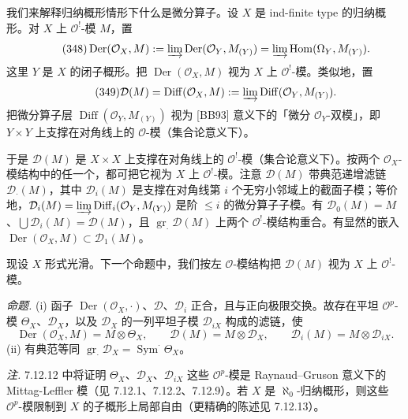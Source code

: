  我们来解释归纳概形情形下什么是微分算子。设 $X$ 是 ind-finite type 的归纳概形。对 $X$ 上 $\mathcal{O}^!$-模 $M$，置
\begin{equation}\tag{348}
\operatorname{Der}(\mathcal{O}_X,M):=\varinjlim\operatorname{Der}(\mathcal{O}_Y,M_{(Y)})=\varinjlim\operatorname{Hom}(\Omega_Y,M_{(Y)}).
\end{equation}
这里 $Y$ 是 $X$ 的闭子概形。把 $\operatorname{Der}(\mathcal{O}_X,M)$ 视为 $X$ 上 $\mathcal{O}^!$-模。类似地，置
\begin{equation}\tag{349}
\mathcal{D}(M)=\operatorname{Diff}(\mathcal{O}_X,M):=\varinjlim\operatorname{Diff}(\mathcal{O}_Y,M_{(Y)}).
\end{equation}
把微分算子层 $\operatorname{Diff}(\mathcal{O}_Y,M_{(Y)})$ 视为 [BB93] 意义下的「微分 $\mathcal{O}_Y$-双模」，即 $Y\times Y$ 上支撑在对角线上的 $\mathcal{O}$-模（集合论意义下）。

于是 $\mathcal{D}(M)$ 是 $X\times X$ 上支撑在对角线上的 $\mathcal{O}^!$-模（集合论意义下）。按两个 $\mathcal{O}_X$-模结构中的任一个，都可把它视为 $X$ 上 $\mathcal{O}^!$-模。注意 $\mathcal{D}(M)$ 带典范递增滤链 $\mathcal{D}_\cdot(M)$，其中 $\mathcal{D}_i(M)$ 是支撑在对角线第 $i$ 个无穷小邻域上的截面子模；等价地，$\mathcal{D}_i(M)=\varinjlim\operatorname{Diff}_i(\mathcal{O}_Y,M_{(Y)})$ 是阶 $\le i$ 的微分算子子模。有 $\mathcal{D}_0(M)=M$、$\bigcup\mathcal{D}_i(M)=\mathcal{D}(M)$，且 $\operatorname{gr}_\cdot\mathcal{D}(M)$ 上两个 $\mathcal{O}^!$-模结构重合。有显然的嵌入 $\operatorname{Der}(\mathcal{O}_X,M)\subset\mathcal{D}_1(M)$。


现设 $X$ 形式光滑。下一个命题中，我们按左 $\mathcal{O}$-模结构把 $\mathcal{D}(M)$ 视为 $X$ 上 $\mathcal{O}^!$-模。

 \emph{命题.} (i) 函子 $\operatorname{Der}(\mathcal{O}_X,\cdot)$、$\mathcal{D}$、$\mathcal{D}_i$ 正合，且与正向极限交换。故存在平坦 $\mathcal{O}^p$-模 $\Theta_X$、$\mathcal{D}_X$，以及 $\mathcal{D}_X$ 的一列平坦子模 $\mathcal{D}_{iX}$ 构成的滤链，使
\[
\operatorname{Der}(\mathcal{O}_X,M)=M\otimes\Theta_X,\qquad\mathcal{D}(M)=M\otimes\mathcal{D}_X,\qquad\mathcal{D}_i(M)=M\otimes\mathcal{D}_{iX}.
\]
(ii) 有典范等同 $\operatorname{gr}_\cdot\mathcal{D}_X=\operatorname{Sym}^\cdot\Theta_X$。

\emph{注.} 7.12.12 中将证明 $\Theta_X$、$\mathcal{D}_X$、$\mathcal{D}_{iX}$ 这些 $\mathcal{O}^p$-模是 Raynaud--Gruson 意义下的 Mittag-Leffler 模（见 7.12.1、7.12.2、7.12.9）。若 $X$ 是 $\aleph_0$-归纳概形，则这些 $\mathcal{O}^p$-模限制到 $X$ 的子概形上局部自由（更精确的陈述见 7.12.13）。

